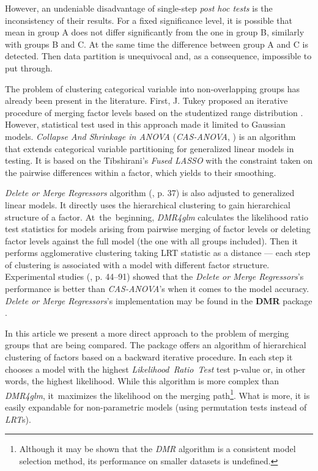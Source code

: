 However, an undeniable disadvantage of single-step \emph{post hoc tests} is the inconsistency of their results. For a fixed significance level, it is possible that mean in group A does not differ significantly from the one in group B, similarly with groups B and C. At the same time the difference between group A and C is detected. Then data partition is unequivocal and, as a consequence, impossible to put through. 

The problem of clustering categorical variable into non-overlapping groups has already been present in the literature. First, J. Tukey proposed an iterative procedure of merging factor levels based on the studentized range distribution \citep{Tukey}. However, statistical test used in this approach made it limited to Gaussian models. \emph{Collapse And Shrinkage in ANOVA} (\emph{CAS-ANOVA}, \citealp{Casanova}) is an algorithm that extends categorical variable partitioning for generalized linear models in testing. It is based on the Tibshirani's \emph{Fused LASSO} \citep{Tib} with the constraint taken on the pairwise differences within a factor, which yields to their smoothing.

\emph{Delete or Merge Regressors} algorithm (\citealp{Proch}, p. 37) is also adjusted to generalized linear models. It directly uses the hierarchical clustering to gain hierarchical structure of a factor. At~the~beginning, \emph{DMR4glm} calculates the likelihood ratio test statistics for models arising from pairwise merging of factor levels or deleting factor levels against the full model (the one with all groups included). Then it performs agglomerative clustering taking LRT statistic as a distance --- each step of clustering is associated with a model with different factor structure. Experimental studies (\citealp{Proch}, p. 44--91) showed that the \emph{Delete or Merge Regressors}'s performance is better than \emph{CAS-ANOVA}'s when it comes to the model accuracy. \emph{Delete or Merge Regressors}'s implementation may be found in the \textbf{DMR} package \citep{DMR}.

In this article we present a more direct approach to the problem of merging groups that are being compared. The \factorMerger package offers an algorithm of hierarchical clustering of factors based on a backward iterative procedure. In each step it chooses a model with the highest \emph{Likelihood~Ratio~Test} test p-value or, in other words, the highest likelihood. While this algorithm is more complex than \emph{DMR4glm}, it~maximizes the likelihood on the merging path\footnote{Although it may be shown that the \emph{DMR} algorithm is a consistent
model selection method, its performance on smaller datasets is undefined. }. What is more, it is easily expandable for non-parametric models (using permutation tests instead of \emph{LRT}s). 

